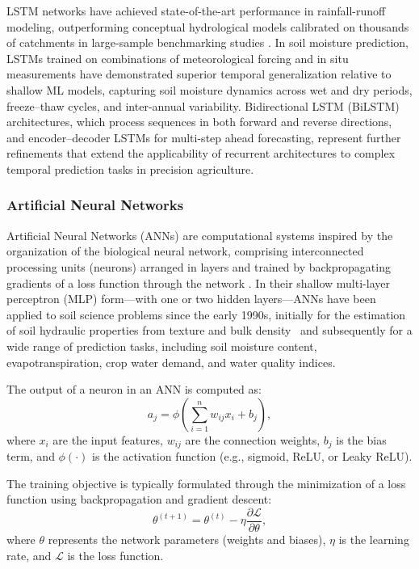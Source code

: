 \documentclass[land,review,accept,pdftex,oneauthor]{Definitions/mdpi}
\begin{document}
LSTM networks have achieved state-of-the-art performance in rainfall-runoff modeling, outperforming conceptual hydrological models calibrated on thousands of catchments in large-sample benchmarking studies \citep{Kratzert2018,Kratzert2019}. In soil moisture prediction, LSTMs trained on combinations of meteorological forcing and in situ measurements have demonstrated superior temporal generalization relative to shallow ML models, capturing soil moisture dynamics across wet and dry periods, freeze--thaw cycles, and inter-annual variability. Bidirectional LSTM (BiLSTM) architectures, which process sequences in both forward and reverse directions, and encoder--decoder LSTMs for multi-step ahead forecasting, represent further refinements that extend the applicability of recurrent architectures to complex temporal prediction tasks in precision agriculture.

\subsubsection{Artificial Neural Networks}

Artificial Neural Networks (ANNs) are computational systems inspired by the organization of the biological neural network, comprising interconnected processing units (neurons) arranged in layers and trained by backpropagating gradients of a loss function through the network \citep{goodfellow2016deep}. In their shallow multi-layer perceptron (MLP) form---with one or two hidden layers---ANNs have been applied to soil science problems since the early 1990s, initially for the estimation of soil hydraulic properties from texture and bulk density~\citep{pachepsky1996developing} and subsequently for a wide range of prediction tasks, including soil moisture content, evapotranspiration, crop water demand, and water quality indices.

The output of a neuron in an ANN is computed as:
\begin{equation}
a_j = \phi \left( \sum_{i=1}^{n} w_{ij} x_i + b_j \right),
\end{equation}
where $x_i$ are the input features, $w_{ij}$ are the connection weights, $b_j$ is the bias term, and $\phi(\cdot)$ is the activation function (e.g., sigmoid, ReLU, or Leaky ReLU).

The training objective is typically formulated through the minimization of a loss function using backpropagation and gradient descent:
\begin{equation}
\theta^{(t+1)} =
\theta^{(t)}
-
\eta
\frac{\partial \mathcal{L}}{\partial \theta},
\end{equation}
where $\theta$ represents the network parameters (weights and biases), $\eta$ is the learning rate, and $\mathcal{L}$ is the loss function.
\end{document}
